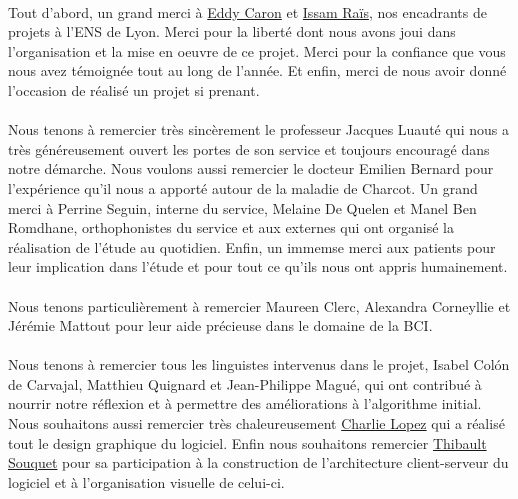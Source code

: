 \documentclass[11pt,a4paper]{article}
\theoremstyle{plain}
\theoremstyle{definition}
\begin{document}
\paragraph{}Tout d'abord, un grand merci à \href{http://graal.ens-lyon.fr/~ecaron/}{Eddy Caron} et \href{http://perso.ens-lyon.fr/issam.rais/}{Issam Raïs}, nos encadrants de projets à
l'ENS de Lyon. Merci pour la liberté dont nous avons joui dans l'organisation et la mise en oeuvre de ce projet. Merci pour la confiance que vous nous avez témoignée tout au long de l'année.
Et enfin, merci de nous avoir donné l'occasion de réalisé un projet si prenant.

\paragraph{}Nous tenons à remercier très sincèrement le professeur Jacques Luauté qui nous a très généreusement ouvert les portes de son service et toujours encouragé dans notre démarche.
Nous voulons aussi remercier le docteur Emilien Bernard pour l'expérience qu'il nous a apporté autour de la maladie de Charcot. Un grand merci à Perrine Seguin, interne 
du service, Melaine De Quelen et Manel Ben Romdhane, orthophonistes du service et aux externes qui ont organisé la réalisation de l'étude au quotidien. Enfin, un immemse merci
aux patients pour leur implication dans l'étude et pour tout ce qu'ils nous ont appris humainement.

\paragraph{}
Nous tenons particulièrement à remercier Maureen Clerc, Alexandra Corneyllie et Jérémie Mattout pour leur aide précieuse dans le domaine de la BCI.

\paragraph{}
Nous tenons à remercier tous les linguistes intervenus dans le projet, Isabel Colón de Carvajal, Matthieu Quignard et Jean-Philippe Magué, qui ont contribué à nourrir notre réflexion et à permettre 
des améliorations à l'algorithme initial. Nous souhaitons aussi remercier très chaleureusement \href{http://www.charlie-lopez.com/}{Charlie Lopez} 
qui a réalisé tout le design graphique du logiciel. Enfin nous souhaitons remercier \href{http://thibaultsouquet.fr/}{Thibault Souquet} pour sa participation à la construction 
de l'architecture client-serveur du logiciel et à l'organisation visuelle de celui-ci.
\end{document}
